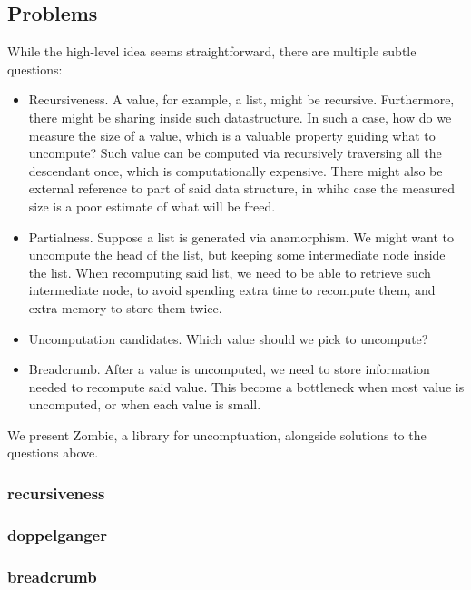 \subsection{Problems}
While the high-level idea seems straightforward, there are multiple subtle questions: 
\begin{itemize}
	\item Recursiveness. A value, for example, a list, might be recursive. Furthermore, there might be sharing inside such datastructure. In such a case, how do we measure the size of a value, which is a valuable property guiding what to uncompute? Such value can be computed via recursively traversing all the descendant once, which is computationally expensive. There might also be external reference to part of said data structure, in whihc case the measured size is a poor estimate of what will be freed.
	\item Partialness. Suppose a list is generated via anamorphism. We might want to uncompute the head of the list, but keeping some intermediate node inside the list.
	When recomputing said list, we need to be able to retrieve such intermediate node, to
	avoid spending extra time to recompute them, and extra memory to store them twice.
	\item Uncomputation candidates. Which value should we pick to uncompute?
	\item Breadcrumb. After a value is uncomputed, we need to store information needed to recompute said value. This become a bottleneck when most value is uncomputed, or when each value is small.
\end{itemize}

We present Zombie, a library for uncomptuation, alongside solutions to the questions above.
\subsubsection{recursiveness}
\subsubsection{doppelganger}
\subsubsection{breadcrumb}
